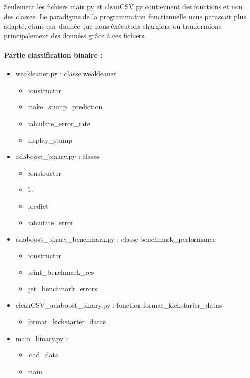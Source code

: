 \documentclass{article}
\begin{document}
Seulement les fichiers main.py et cleanCSV.py contiennent des fonctions et non des classes. Le paradigme de la programmation fonctionnelle nous parassait plus adapté, étant que donnée que nous éxécutons chargions ou tranformions principalement des données grâce à ces fichiers.  

\paragraph{Partie classification binaire : }
\begin{itemize}
  \item weakleaner.py : classe weakleaner
  \begin{itemize}
    \item constructor
    \item make\_stump\_prediction
    \item calculate\_error\_rate
    \item display\_stump
  \end{itemize}
  \item adaboost\_binary.py : classe 
  \begin{itemize}
          \item constructor
            \item fit
            \item predict
            \item calculate\_error
    \end{itemize}
  \item adaboost\_binary\_benchmark.py : classe benchmark\_performance
  \begin{itemize}
          \item constructor
          \item print\_benchmark\_res
          \item get\_benchmark\_errors
    \end{itemize}
  \item cleanCSV\_adaboost\_binary.py : fonction format\_kickstarter\_datas
  \begin{itemize}
            \item format\_kickstarter\_datas
    \end{itemize}
  \item main\_binary.py :
  \begin{itemize}
          \item load\_data
          \item main
    \end{itemize}

\end{itemize}
\end{document}
